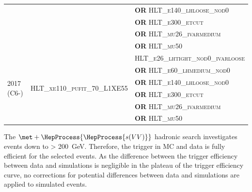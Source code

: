 \begin{table}[hbtp]
{{\begin{tabular}{l l l}
& & \textbf{OR} \textsc{HLT\_e140\_lhloose\_nod0} \\
& & \textbf{OR} \textsc{HLT\_e300\_etcut} \\
& & \textbf{OR} \textsc{HLT\_mu26\_ivarmedium} \\
& & \textbf{OR} \textsc{HLT\_mu50} \\
\midrule
\multirow{6}{*}{2017 (C6-)} & \multirow{7}{*}{\textsc{HLT\_xe110\_pufit\_70\_L1XE55}} & \textsc{HLT\_e26\_lhtight\_nod0\_ivarloose} \\
& & \textbf{OR} \textsc{HLT\_e60\_lhmedium\_nod0} \\
& & \textbf{OR} \textsc{HLT\_e140\_lhloose\_nod0} \\
& & \textbf{OR} \textsc{HLT\_e300\_etcut} \\
& & \textbf{OR} \textsc{HLT\_mu26\_ivarmedium} \\
& & \textbf{OR} \textsc{HLT\_mu50} \\
\bottomrule
\end{tabular}%
}
}
\end{table}

The \(\met + \HepProcess{\HepProcess{s(VV)}}\) hadronic search investigates events down to \met > \SI{200}{\giga\electronvolt}. Therefore, the \met trigger in MC and data is fully efficient for the selected events. As the difference between the trigger efficiency between data and simulations is negligible in the plateau of the \met trigger efficiency curve, no corrections for potential differences between data and simulations are applied to simulated events.
